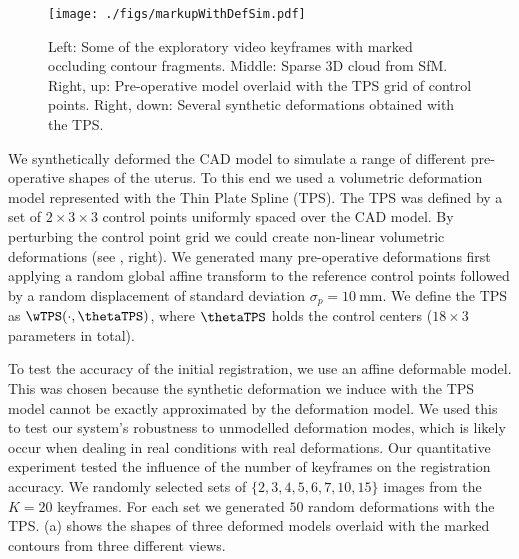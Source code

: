 \begin{figure}[htb]
  \centering
  \texttt{[image: ./figs/markupWithDefSim.pdf]}
\caption{Left: Some of the  exploratory video keyframes with marked occluding contour fragments. Middle: Sparse 3D cloud from SfM. Right, up: Pre-operative model overlaid with the TPS grid of control points. Right, down: Several synthetic deformations obtained with the TPS.}
\label{fig:reconstruction}
\end{figure}

We synthetically deformed the CAD model to simulate a range of different pre-operative shapes of the uterus. To this end we used a volumetric deformation model represented with the Thin Plate Spline (TPS). The TPS was defined by a set of $2\times 3 \times 3$ control points uniformly spaced over the CAD model. By perturbing the control point grid we could create non-linear volumetric deformations (see , right). We generated many pre-operative deformations first applying a random global affine transform to the reference control points followed by a random displacement of standard deviation $\sigma_p=\SI{10}{\milli\metre}$. We define the TPS as $\wTPS(\cdot,\thetaTPS)$, where $\thetaTPS$ holds the control centers (\ie $18\times 3$ parameters in total).

%
To test the accuracy of the initial registration, we use an affine deformable model. This was chosen because the synthetic deformation we induce with the TPS model cannot be exactly approximated by the deformation model. We used this to test our system's robustness to unmodelled deformation modes, which is likely occur when dealing in real conditions with real deformations.
Our quantitative experiment tested the influence of the number of keyframes on the registration accuracy. We randomly selected sets of $\{2,3,4,5,6,7,10,15\}$ images from the $K=20$ keyframes. For each set we generated $50$ random deformations with the TPS. (a) shows the shapes of three deformed models overlaid with the marked contours from three different views.
    

